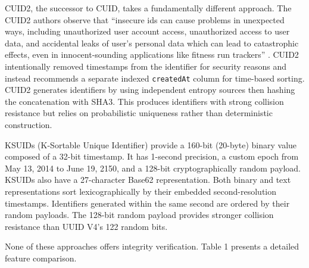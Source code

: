 \documentclass[a4paper,fleqn]{cas-sc}
\begin{document}
CUID2, the successor to CUID, takes a fundamentally different approach.
The CUID2 authors observe that ``insecure ids can cause problems in
unexpected ways, including unauthorized user account access,
unauthorized access to user data, and accidental leaks of user's
personal data which can lead to catastrophic effects, even in
innocent-sounding applications like fitness run trackers''
\citep{cuid2}. CUID2 intentionally removed timestamps from the
identifier for security reasons and instead recommends a separate
indexed \texttt{createdAt} column for time-based sorting. CUID2
generates identifiers by using independent entropy sources then hashing
the concatenation with SHA3. This produces identifiers with strong
collision resistance but relies on probabilistic uniqueness rather than
deterministic construction.

KSUIDs \citep{ksuid} (K-Sortable Unique Identifier) provide a 160-bit
(20-byte) binary value composed of a 32-bit timestamp. It has 1-second
precision, a custom epoch from May 13, 2014 to June 19, 2150, and a
128-bit cryptographically random payload. KSUIDs also have a
27-character Base62 representation. Both binary and text representations
sort lexicographically by their embedded second-resolution timestamps.
Identifiers generated within the same second are ordered by their random
payloads. The 128-bit random payload provides stronger collision
resistance than UUID V4's 122 random bits.

None of these approaches offers integrity verification. Table 1 presents
a detailed feature comparison.
\end{document}
